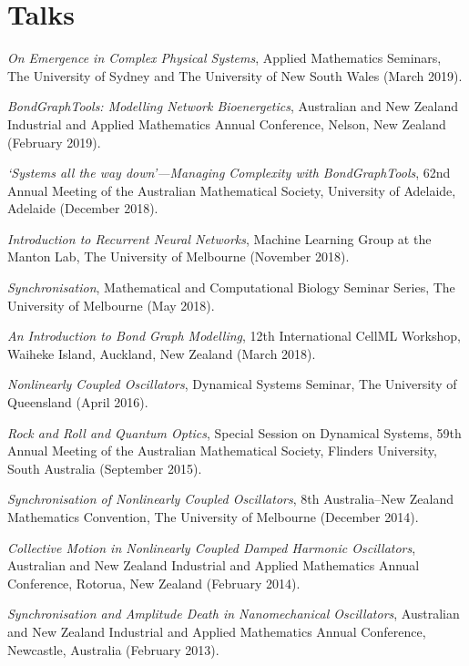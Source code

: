 \documentclass[letterpaper]{article}
\renewenvironment{itemize}{
  \begin{list}{}{
    \setlength{\leftmargin}{1.5em}
  }
}{
  \end{list}
}
\begin{document}
\section*{Talks}
\begin{itemize}
	\item {\em On Emergence in Complex Physical Systems}, Applied Mathematics Seminars, The University of Sydney and The University of New South Wales (March 2019).
	\item {\em BondGraphTools: Modelling Network Bioenergetics}, Australian and New Zealand Industrial and Applied Mathematics Annual Conference, Nelson, New Zealand (February 2019).
	\item {\em `Systems all the way down'---Managing Complexity with BondGraphTools}, 62nd Annual Meeting of the Australian Mathematical Society, University of Adelaide, Adelaide (December 2018).
	\item {\em Introduction to Recurrent Neural Networks}, Machine Learning Group at the Manton Lab, The University of Melbourne (November 2018).
	\item {\em Synchronisation}, Mathematical and Computational Biology Seminar Series, The University of Melbourne (May 2018).
	\item {\em An Introduction to Bond Graph Modelling}, 12th International CellML Workshop, Waiheke Island, Auckland, New Zealand (March 2018).
	\item {\em Nonlinearly Coupled Oscillators}, Dynamical Systems Seminar, The University of Queensland (April 2016).
	\item {\em Rock and Roll and Quantum Optics}, Special Session on Dynamical Systems, 59th Annual Meeting of the Australian Mathematical Society, Flinders University, South Australia (September 2015).
	\item {\em Synchronisation of Nonlinearly Coupled Oscillators}, 8th Australia--New Zealand Mathematics Convention, The University of Melbourne (December 2014).
	\item {\em Collective Motion in Nonlinearly Coupled Damped Harmonic Oscillators}, Australian and New Zealand Industrial and Applied Mathematics Annual Conference, Rotorua, New Zealand (February 2014).
	\item {\em Synchronisation and Amplitude Death in Nanomechanical Oscillators}, Australian and New Zealand Industrial and Applied Mathematics Annual Conference, Newcastle, Australia (February 2013).
\end{itemize}
\end{document}
